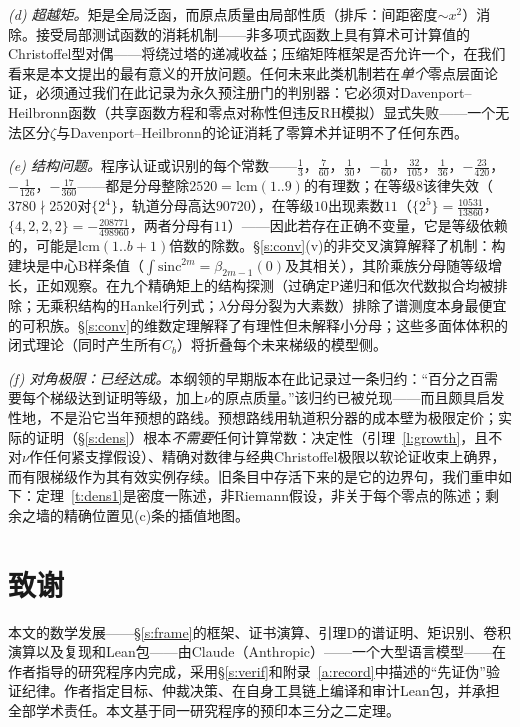\documentclass[11pt]{article}
\numberwithin{equation}{section}
\theoremstyle{definition}
\theoremstyle{remark}
\begin{document}
\emph{(d) 超越矩。}矩是全局泛函，而原点质量由局部性质（排斥：间距密度$\sim x^{2}$）消除。接受局部测试函数的消耗机制——非多项式函数上具有算术可计算值的Christoffel型对偶——将绕过塔的递减收益；压缩矩阵框架是否允许一个，在我们看来是本文提出的最有意义的开放问题。任何未来此类机制若在\emph{单个}零点层面论证，必须通过我们在此记录为永久预注册门的判别器：它必须对Davenport--Heilbronn函数（共享函数方程和零点对称性但违反RH模拟）显式失败——一个无法区分$\zeta$与Davenport--Heilbronn的论证消耗了零算术并证明不了任何东西。

\emph{(e) 结构问题。}程序认证或识别的每个常数——$\tfrac13$，$\tfrac7{60}$，$\tfrac1{30}$，$-\tfrac1{60}$，$\tfrac{32}{105}$，$\tfrac1{36}$，$-\tfrac{23}{420}$，$-\tfrac1{126}$，$-\tfrac{17}{360}$——都是分母整除$2520=\mathrm{lcm}(1..9)$的有理数；在等级$8$该律失效（$3780\nmid2520$对$\{2^4\}$，轨道分母高达$90720$），在等级$10$出现素数$11$（$\{2^5\}=\tfrac{10531}{13860}$，$\{4,2,2,2\}=-\tfrac{208771}{498960}$，两者分母有$11$）——因此若存在正确不变量，它是等级依赖的，可能是$\mathrm{lcm}(1..b{+}1)$倍数的除数。\S\ref{s:conv}(v)的非交叉演算解释了机制：构建块是中心B样条值（$\int\mathrm{sinc}^{2m}=\beta_{2m-1}(0)$及其相关），其阶乘族分母随等级增长，正如观察。在九个精确矩上的结构探测（过确定P递归和低次代数拟合均被排除；无乘积结构的Hankel行列式；$\lambda$分母分裂为大素数）排除了谱测度本身最便宜的可积族。\S\ref{s:conv}的维数定理解释了有理性但未解释小分母；这些多面体体积的闭式理论（同时产生所有$C_b$）将折叠每个未来梯级的模型侧。

\emph{(f) 对角极限：已经达成。}本纲领的早期版本在此记录过一条归约：“百分之百需要每个梯级达到证明等级，加上$\nu$的原点质量。”该归约已被兑现——而且颇具启发性地，不是沿它当年预想的路线。预想路线用轨道积分器的成本壁为极限定价；实际的证明（\S\ref{s:dens}）根本\emph{不需要}任何计算常数：决定性（引理~\ref{l:growth}，且不对$\nu$作任何紧支撑假设）、精确对数律与经典Christoffel极限以软论证收束上确界，而有限梯级作为其有效实例存续。旧条目中存活下来的是它的边界句，我们重申如下：定理~\ref{t:dens1}是密度一陈述，非Riemann假设，非关于每个零点的陈述；剩余之墙的精确位置见(c)条的插值地图。

\section*{致谢}

本文的数学发展——\S\ref{s:frame}的框架、证书演算、引理D的谱证明、矩识别、卷积演算以及复现和Lean包——由Claude（Anthropic）——一个大型语言模型——在作者指导的研究程序内完成，采用\S\ref{s:verif}和附录~\ref{a:record}中描述的“先证伪”验证纪律。作者指定目标、仲裁决策、在自身工具链上编译和审计Lean包，并承担全部学术责任。本文基于同一研究程序的预印本三分之二定理\cite{C26}。
\end{document}
